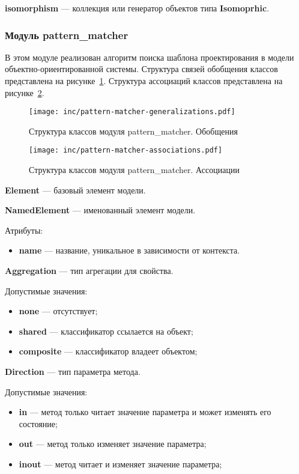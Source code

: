 \textbf{isomorphism} --- коллекция или генератор объектов типа \textbf{Isomoprhic}.

\subsubsection{Модуль pattern\_matcher}

В этом модуле реализован алгоритм поиска шаблона проектирования в модели
объектно-ориентированной системы.
Структура связей обобщения классов представлена на рисунке~\ref{fig:pattern-matcher-generalizations}.
Структура ассоциаций классов представлена на рисунке~\ref{fig:pattern-matcher-associations}.

\begin{figure}[!ht]
\centering
\texttt{[image: inc/pattern-matcher-generalizations.pdf]}
\caption{Структура классов модуля pattern\_matcher. Обобщения}
\label{fig:pattern-matcher-generalizations}
\end{figure}

\begin{figure}[!ht]
\centering
\texttt{[image: inc/pattern-matcher-associations.pdf]}
\caption{Структура классов модуля pattern\_matcher. Ассоциации}
\label{fig:pattern-matcher-associations}
\end{figure}

\textbf{Element} --- базовый элемент модели.

\textbf{NamedElement} --- именованный элемент модели.

Атрибуты:
\begin{itemize}
\item \textbf{name} --- название, уникальное в зависимости от контекста.
\end{itemize}

\textbf{Aggregation} --- тип агрегации для свойства.

Допустимые значения:
\begin{itemize}
\item \textbf{none} --- отсутствует;
\item \textbf{shared} --- классификатор ссылается на объект;
\item \textbf{composite} --- классификатор владеет объектом;
\end{itemize}

\textbf{Direction} --- тип параметра метода.

Допустимые значения:
\begin{itemize}
\item \textbf{in} --- метод только читает значение параметра и может изменять его состояние;
\item \textbf{out} --- метод только изменяет значение параметра;
\item \textbf{inout} --- метод читает и изменяет значение параметра;
\end{itemize}

